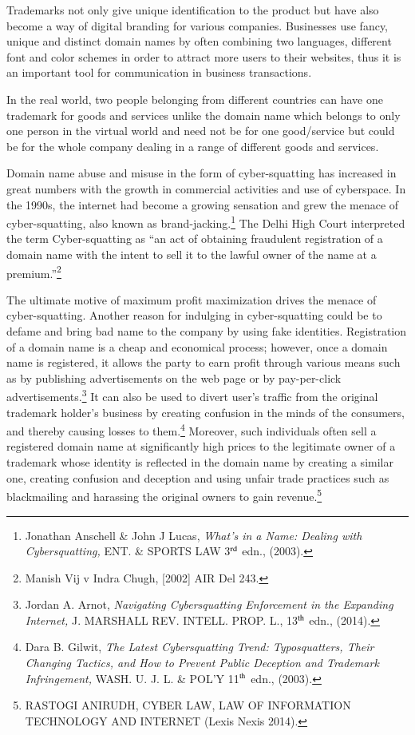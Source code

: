 \begin{multicols}{2}
\noi
Trademarks not only give unique identification to the product but have also become a way of
digital branding for various companies. Businesses use fancy, unique and distinct domain
names by often combining two languages, different font and color schemes in order to attract
more users to their websites, thus it is an important tool for communication in business
transactions.

\noi
In the real world, two people belonging from different countries can have one trademark for
goods and services unlike the domain name which belongs to only one person in the virtual
world and need not be for one good/service but could be for the whole company dealing in a
range of different goods and services.


\noi
Domain name abuse and misuse in the form of cyber-squatting has increased in great
numbers with the growth in commercial activities and use of cyberspace. In the 1990s, the
internet had become a growing sensation and grew the menace of cyber-squatting, also
known as brand-jacking.\footnote{Jonathan Anschell \& John J Lucas, \textit{What’s in a Name: Dealing with Cybersquatting,} ENT. \& SPORTS LAW 3$^{\rm rd}$ edn., (2003).} The Delhi High Court interpreted the term Cyber-squatting as “an
act of obtaining fraudulent registration of a domain name with the intent to sell it to the
lawful owner of the name at a premium.”\footnote{Manish Vij v Indra Chugh, [2002] AIR Del 243.}

\noi
The ultimate motive of maximum profit maximization drives the menace of cyber-squatting.
Another reason for indulging in cyber-squatting could be to defame and bring bad name to
the company by using fake identities. Registration of a domain name is a cheap and
economical process; however, once a domain name is registered, it allows the party to earn
profit through various means such as by publishing advertisements on the web page or by
pay-per-click advertisements.\footnote{Jordan A. Arnot, \textit{Navigating Cybersquatting Enforcement in the Expanding Internet,} J. MARSHALL REV. INTELL. PROP. L., 13$^{\rm th}$ edn., (2014).} It can also be used to divert user’s traffic from the original
trademark holder’s business by creating confusion in the minds of the consumers, and thereby
causing losses to them.\footnote{Dara B. Gilwit, \textit{The Latest Cybersquatting Trend: Typosquatters, Their Changing Tactics, and How to Prevent Public Deception and Trademark Infringement,} WASH. U. J. L. \& POL’Y 11$^{\rm th}$ edn., (2003).} Moreover, such individuals often sell a registered domain name at
significantly high prices to the legitimate owner of a trademark whose identity is reflected in the domain name by creating a similar one, creating confusion and deception and using unfair
trade practices such as blackmailing and harassing the original owners to gain revenue.\footnote{RASTOGI ANIRUDH, CYBER LAW, LAW OF INFORMATION TECHNOLOGY AND INTERNET (Lexis Nexis 2014).}


\end{multicols}
